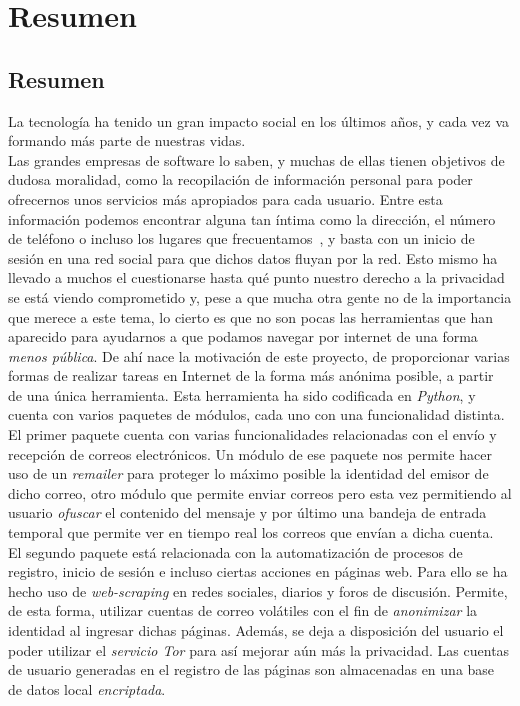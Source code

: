 \chapter*{Resumen}

\section*{Resumen}
La tecnología ha tenido un gran impacto social en los últimos años, y cada vez va formando más parte de nuestras vidas.\\
Las grandes empresas de software lo saben, y muchas de ellas tienen objetivos de dudosa moralidad, como la recopilación de información personal para poder ofrecernos unos servicios más apropiados para cada usuario. Entre esta información podemos encontrar alguna tan íntima como la dirección, el número de teléfono o incluso los lugares que frecuentamos~\cite{article:google}, y basta con un inicio de sesión en una red social para que dichos datos fluyan por la red.
Esto mismo ha llevado a muchos el cuestionarse hasta qué punto nuestro derecho a la privacidad se está viendo comprometido y, pese a que mucha otra gente no de la importancia que merece a este tema, lo cierto es que no son pocas las herramientas que han aparecido para ayudarnos a que podamos navegar por internet de una forma \textit{menos pública}.
De ahí nace la motivación de este proyecto, de proporcionar varias formas de realizar tareas en Internet de la forma más anónima posible, a partir de una única herramienta. Esta herramienta ha sido codificada en \textit{Python}, y cuenta con varios paquetes de módulos, cada uno con una funcionalidad distinta.\\
El primer paquete cuenta con varias funcionalidades relacionadas con el envío y recepción de correos electrónicos. Un módulo de ese paquete nos permite hacer uso de un \textit{remailer} para proteger lo máximo posible la identidad del emisor de dicho correo, otro módulo que permite enviar correos pero esta vez permitiendo al usuario \textit{ofuscar} el contenido del mensaje y por último una bandeja de entrada temporal que permite ver en tiempo real los correos que envían a dicha cuenta.\\
El segundo paquete está relacionada con la automatización de procesos de registro, inicio de sesión e incluso ciertas acciones en páginas web. Para ello se ha hecho uso de \textit{web-scraping} en redes sociales, diarios y foros de discusión. Permite, de esta forma, utilizar cuentas de correo volátiles con el fin de \textit{anonimizar} la identidad al ingresar dichas páginas. Además, se deja a disposición del usuario el poder utilizar el \textit{servicio Tor} para así mejorar aún más la privacidad. Las cuentas de usuario generadas en el registro de las páginas son almacenadas en una base de datos local \textit{encriptada}. \\
